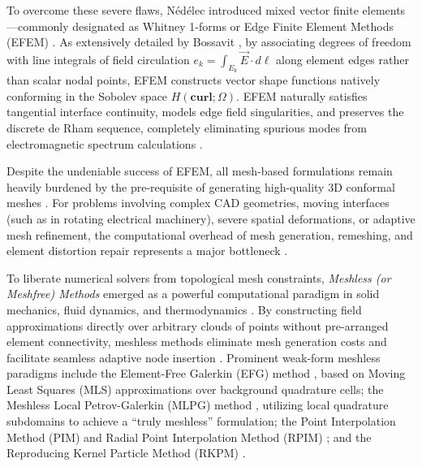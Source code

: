 \documentclass[preprint,12pt]{elsarticle}
\begin{document}
To overcome these severe flaws, N\'ed\'elec \cite{nedelec1980mixed} introduced mixed vector finite elements---commonly designated as Whitney 1-forms or Edge Finite Element Methods (EFEM) \cite{monk2003finite, bossavit1998computational, boffi2013mixed}. As extensively detailed by Bossavit \cite{bossavit1998computational}, by associating degrees of freedom with line integrals of field circulation $e_k = \int_{E_k} \vec{E} \cdot d\boldsymbol{\ell}$ along element edges rather than scalar nodal points, EFEM constructs vector shape functions natively conforming in the Sobolev space $H(\mathbf{curl}; \Omega)$. EFEM naturally satisfies tangential interface continuity, models edge field singularities, and preserves the discrete de Rham sequence, completely eliminating spurious modes from electromagnetic spectrum calculations \cite{monk2003finite, bossavit1998computational, boffi2013mixed}.

Despite the undeniable success of EFEM, all mesh-based formulations remain heavily burdened by the pre-requisite of generating high-quality 3D conformal meshes \cite{idelsohn2006mesh, liu2009mesh}. For problems involving complex CAD geometries, moving interfaces (such as in rotating electrical machinery), severe spatial deformations, or adaptive mesh refinement, the computational overhead of mesh generation, remeshing, and element distortion repair represents a major bottleneck \cite{idelsohn2006mesh, liu2009mesh, slak2018refined}.

To liberate numerical solvers from topological mesh constraints, \emph{Meshless (or Meshfree) Methods} emerged as a powerful computational paradigm in solid mechanics, fluid dynamics, and thermodynamics \cite{liu2009mesh, liu2005introduction, atluri2002meshless}. By constructing field approximations directly over arbitrary clouds of points without pre-arranged element connectivity, meshless methods eliminate mesh generation costs and facilitate seamless adaptive node insertion \cite{liu2009mesh, belytschko1994element}. Prominent weak-form meshless paradigms include the Element-Free Galerkin (EFG) method \cite{belytschko1994element}, based on Moving Least Squares (MLS) approximations over background quadrature cells; the Meshless Local Petrov-Galerkin (MLPG) method \cite{atluri1998new, atluri2002meshless}, utilizing local quadrature subdomains to achieve a ``truly meshless'' formulation; the Point Interpolation Method (PIM) and Radial Point Interpolation Method (RPIM) \cite{liu2001point, liu2005introduction}; and the Reproducing Kernel Particle Method (RKPM) \cite{liu2009mesh}.
\end{document}

